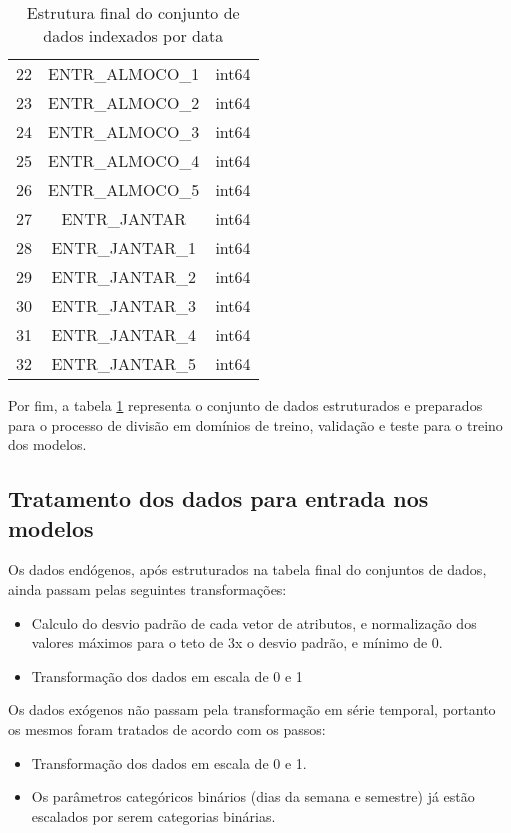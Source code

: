 \begin{table}[!ht]
\begin{tabular}{|c|c|c|}
                22&	ENTR\_ALMOCO\_1				&int64 \\
                23&	ENTR\_ALMOCO\_2				&int64 \\
                24&	ENTR\_ALMOCO\_3				&int64 \\ 
                25&	ENTR\_ALMOCO\_4				&int64 \\
                26&	ENTR\_ALMOCO\_5				&int64 \\
                27&	ENTR\_JANTAR				&	int64 \\ 
                28&	ENTR\_JANTAR\_1				&int64\\
                29&	ENTR\_JANTAR\_2				&int64 \\ 
                30&	ENTR\_JANTAR\_3				&int64 \\ 
                31&	ENTR\_JANTAR\_4				&int64 \\
                32&	ENTR\_JANTAR\_5				&int64\\
              \hline
            \end{tabular}
            \caption{Estrutura final do conjunto de dados indexados por data}
            \label{table:dataset_final}
        \end{table}
        Por fim, a tabela \ref{table:dataset_final} representa o conjunto de dados estruturados e preparados para o processo de divisão em domínios de treino, validação e teste para o treino dos modelos.
        
        \subsection{Tratamento dos dados para entrada nos modelos}
         	Os dados endógenos, após estruturados na tabela final do conjuntos de dados, ainda passam pelas seguintes transformações:
         	\begin{itemize}
                \item	Calculo do desvio padrão de cada vetor de atributos, e normalização dos valores máximos para o teto de 3x o desvio padrão, e mínimo de 0. 
                \item	Transformação dos dados em escala de 0 e 1
            \end{itemize}
            Os dados exógenos não passam pela transformação em série temporal, portanto os mesmos foram tratados de acordo com os passos:
            \begin{itemize}
                \item	Transformação dos dados em escala de 0 e 1.
                \item	Os parâmetros categóricos binários (dias da semana e semestre) já estão escalados por serem categorias binárias.
            \end{itemize}
